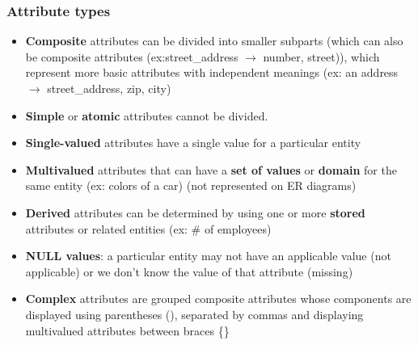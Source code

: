     \subsubsection{Attribute types}
    \begin{itemize}
        \item \textbf{Composite} attributes can be divided into smaller subparts (which can also be composite attributes (ex:street\_address $\rightarrow$ number, street)), which represent more basic attributes with independent meanings (ex: an address $\rightarrow$ street\_address, zip, city)
        \item \textbf{Simple} or \textbf{atomic} attributes cannot be divided.
        \item \textbf{Single-valued} attributes have a single value for a particular entity
        \item \textbf{Multivalued} attributes that can have a \textbf{set of values} or \textbf{domain} for the same entity (ex: colors of a car) (not represented on ER diagrams)
        \item \textbf{Derived} attributes can be determined by using one or more \textbf{stored} attributes or related entities (ex: \# of employees)
        \item \textbf{NULL values}: a particular entity may not have an applicable value (not applicable) or we don't know the value of that attribute (missing)
        \item \textbf{Complex} attributes are grouped composite attributes whose components are displayed using parentheses (), separated by commas and displaying multivalued attributes between braces \{\}
    \end{itemize}


